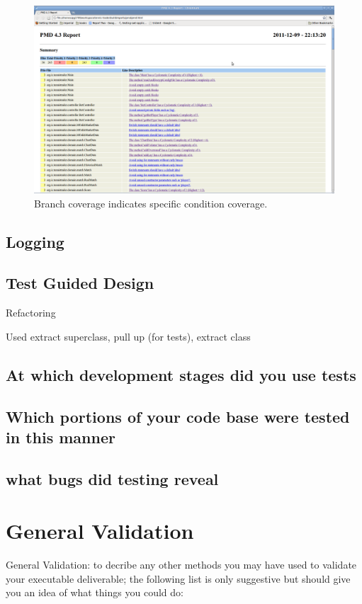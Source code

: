 \documentclass[10pt]{article}
\begin{document}
\begin{figure}[ht]
\centering
\includegraphics[bb=0 0 1680 1050, scale = 0.2]{pmd.png}
\caption{Branch coverage indicates specific condition coverage.}
\end{figure}

\subsection{Logging}

\subsection{Test Guided Design}
Refactoring

Used extract superclass, pull up (for tests), extract class


\subsection{At which development stages did you use tests}

\subsection{Which portions of your code base were tested in this manner}

\subsection{what bugs did testing reveal}

\section{General Validation}
General Validation: to decribe any other methods you may have used to validate your executable deliverable; the following list is only suggestive but should give you an idea of what things you could do:
\end{document}
